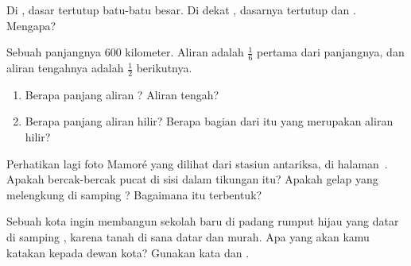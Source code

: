 \begin{exercise}[$\star$]\label{exo:g5:water-shapes-the-land:6}
Di , dasar  tertutup batu-batu besar. Di dekat ,
dasarnya tertutup  dan . Mengapa?
\end{exercise}

\begin{exercise}[$\star\star$]\label{exo:g5:water-shapes-the-land:7}
Sebuah  panjangnya 600 kilometer. Aliran  adalah
$\frac{1}{6}$ pertama dari panjangnya, dan aliran tengahnya adalah
$\frac{1}{2}$ berikutnya.
\begin{enumerate}
  \item[(a)] Berapa panjang aliran ? Aliran tengah?
  \item[(b)] Berapa panjang aliran hilir? Berapa bagian dari  itu
        yang merupakan aliran hilir?
\end{enumerate}
\end{exercise}

\begin{exercise}[$\star\star$]\label{exo:g5:water-shapes-the-land:8}
Perhatikan lagi foto  Mamoré yang dilihat dari stasiun antariksa, di
halaman~\pageref{fig:g5:water-shapes-the-land:mamore}. Apakah bercak-bercak pucat di sisi dalam
tikungan itu? Apakah  gelap yang melengkung di samping ?
Bagaimana  itu terbentuk?
\end{exercise}

\begin{exercise}[$\star\star$]\label{exo:g5:water-shapes-the-land:9}
Sebuah kota ingin membangun sekolah baru di padang rumput hijau yang datar
di samping , karena tanah di sana datar dan murah. Apa yang akan
kamu katakan kepada dewan kota? Gunakan kata \emph{} dan
\emph{}.
\end{exercise}

